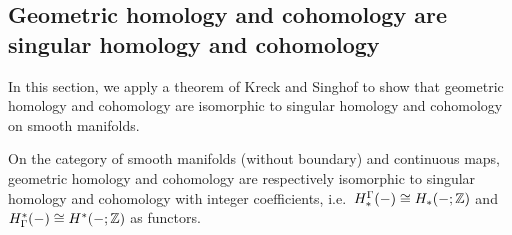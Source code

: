 \subsection{Geometric homology and cohomology are singular homology and cohomology}\label{S: homology is homology}

In this section, we apply a theorem of Kreck and Singhof to show that geometric homology and cohomology are isomorphic to singular homology and cohomology on smooth manifolds.

\begin{theorem}\label{T: geometric is singular}
	On the category of smooth manifolds (without boundary) and continuous maps, geometric homology and cohomology are respectively isomorphic to singular homology and cohomology with integer coefficients, i.e.\ $H_*^\Gamma(-) \cong H_*(- ;\mathbb{Z})$ and $H^*_\Gamma(-) \cong H^*(-;\mathbb{Z})$ as functors.
\end{theorem}

